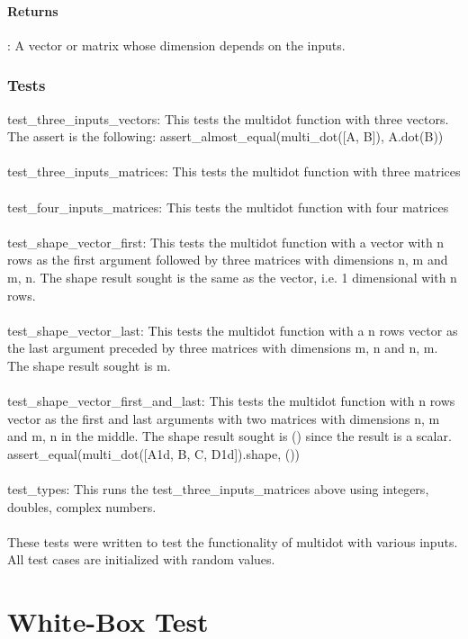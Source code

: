 \documentclass[a4paper,11pt]{article}
\begin{document}
\paragraph{Returns}: A vector or matrix whose dimension depends on the inputs. 
\subsubsection{Tests}
test\_three\_inputs\_vectors: This tests the multidot function with three vectors. The assert is the following: assert\_almost\_equal(multi\_dot([A, B]), A.dot(B))\\
\\
test\_three\_inputs\_matrices: This tests the multidot function with three matrices\\
\\
test\_four\_inputs\_matrices: This tests the multidot function with four matrices\\
\\
test\_shape\_vector\_first: This tests the multidot function with a vector with n rows as the first argument followed by three matrices with dimensions n, m and m, n. The shape result sought is the same as the vector, i.e. 1 dimensional with n rows. \\
\\
test\_shape\_vector\_last: This tests the multidot function with a n rows vector as the last argument preceded by three matrices with dimensions m, n and n, m. The shape result sought is m. \\
\\
test\_shape\_vector\_first\_and\_last: This tests the multidot function with n rows vector as the first and last arguments with two matrices with dimensions n, m and m, n in the middle. The shape result sought is () since the result is a scalar. assert\_equal(multi\_dot([A1d, B, C, D1d]).shape, ())\\
\\
test\_types: This runs the test\_three\_inputs\_matrices above using integers, doubles, complex numbers. \\
\\
These tests were written to test the functionality of multidot with various inputs. All test cases are initialized with random values. 

\section{White-Box Test}


\end{document}
